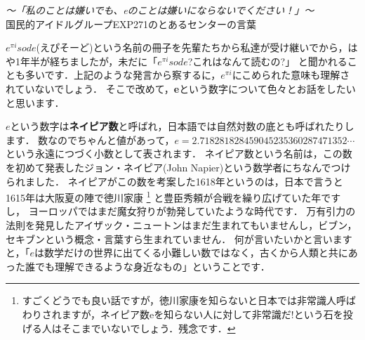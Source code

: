 



\begin{flushright}
\textit {〜「私のことは嫌いでも、eのことは嫌いにならないでください！」〜}\\
国民的アイドルグループEXP271のとあるセンターの言葉
\end{flushright}

$e^{\pi i}sode$(えぴそーど)という名前の冊子を先輩たちから私達が受け継いでから，はや1年半が経ちましたが，未だに「$e^{\pi i}sode$?これはなんて読むの?」
と聞かれることも多いです．上記のような発言から察するに，$e^{\pi i}$にこめられた意味も理解されていないでしょう．
そこで改めて，\textbf{e}という数字について色々とお話をしたいと思います．

$e$という数字は\textbf{ネイピア数}と呼ばれ，日本語では自然対数の底とも呼ばれたりします．
数なのでちゃんと値があって，$e = 2.718281828459045235360287471352\cdots$という永遠につづく小数として表されます．
ネイピア数という名前は，この数を初めて発表したジョン・ネイピア(John Napier)という数学者にちなんでつけられました．
ネイピアがこの数を考案した1618年というのは，日本で言うと1615年は大阪夏の陣で徳川家康
\footnote{すごくどうでも良い話ですが，徳川家康を知らないと日本では非常識人呼ばわりされますが，ネイピア数eを知らない人に対して非常識だ!という石を投げる人はそこまでいないでしょう．残念です．} と豊臣秀頼が合戦を繰り広げていた年ですし，
ヨーロッパではまだ魔女狩りが勃発していたような時代です．
万有引力の法則を発見したアイザック・ニュートンはまだ生まれてもいませんし，ビブン，セキブンという概念・言葉すら生まれていません．
何が言いたいかと言いますと，「$e$は数学だけの世界に出てくる小難しい数ではなく，古くから人類と共にあった誰でも理解できるような身近なもの」ということです．

